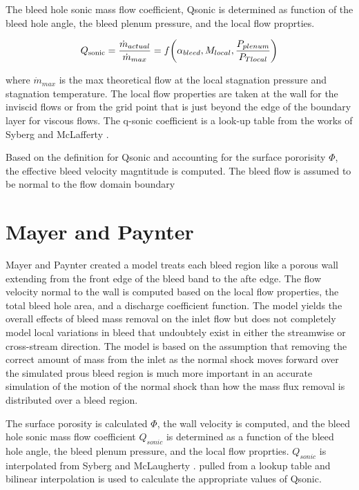 \documentclass{article}
\begin{document}
The bleed hole sonic mass flow coefficient, Qsonic is determined as function of the bleed hole angle, the bleed plenum pressure, and the local flow proprties. 

$$ Q_{\textrm{sonic}} = \frac{\dot{m}_{actual}}{\dot{m}_{max}} = f\qty(\alpha_{bleed},M_{local},\dfrac{P_{plenum}}{P_{Tlocal}}) $$

where $\dot{m}_{max}$ is the max theoretical flow at the local stagnation pressure and stagnation temperature. The local flow properties are taken at the wall for the inviscid flows or from the grid point that is just beyond the edge of the boundary layer for viscous flows. The q-sonic coefficient is a look-up table from the works of Syberg \cite{Syberg1973} and McLafferty \cite{McLafferty1958}.

Based on the definition for Qsonic and accounting for the surface pororisity $\Phi$, the effective bleed velocity magntitude is computed. The bleed flow is assumed to be normal to the flow domain boundary


\section{Mayer and Paynter}

Mayer and Paynter \cite{Mayer1994} created a model treats each bleed region like a porous wall extending from the front edge of the bleed band to the afte edge. The flow velocity normal to the wall is computed based on the local flow properties, the total bleed hole area, and a discharge coefficient function. The model yields the overall effects of bleed mass removal on the inlet flow but does not completely model local variations in bleed that undoubtely exist in either the streamwise or cross-stream direction. The model is based on the assumption that removing the correct amount of mass from the inlet as the normal shock moves forward over the simulated prous bleed region is much more important in an accurate simulation of the motion of the normal shock than how the mass flux removal is distributed over a bleed region.

The surface porosity is calculated $\Phi$, the wall velocity is computed, and the bleed hole sonic mass flow coefficient $Q_{sonic}$ is determined as a function of the bleed hole angle, the bleed plenum pressure, and the local flow proprties. $Q_{sonic}$ is interpolated from Syberg \cite{Syberg1973} and McLaugherty \cite{McLafferty1958}. pulled from a lookup table and bilinear interpolation is used to calculate the appropriate values of Qsonic.
\end{document}
